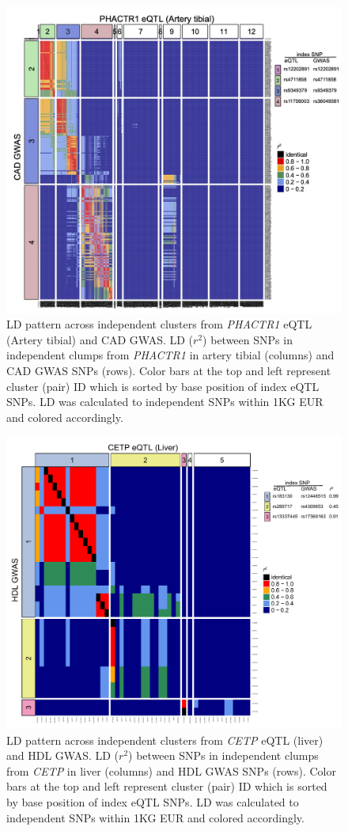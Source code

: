 \documentclass[11pt]{article}
\begin{document}
\begin{figure}[!ht]
  \centering
  \includegraphics[width=.7\textwidth]{figs/heatmap_phactr1.jpg}
  \caption{LD pattern across independent clusters from \emph{PHACTR1}
    eQTL (Artery tibial) and CAD GWAS. LD ($r^2$) between SNPs in
    independent clumps from \emph{PHACTR1} in artery tibial (columns)
    and CAD GWAS SNPs (rows). Color bars at the top and left represent
    cluster (pair) ID which is sorted by base position of index eQTL
    SNPs. LD was calculated to independent SNPs within 1KG EUR and
    colored accordingly.} 
\end{figure}

\begin{figure}[!ht]
  \centering
  \includegraphics[width=.7\textwidth]{figs/heatmap_cetp}
  \caption{LD pattern across independent clusters from \emph{CETP}
    eQTL (liver) and HDL GWAS. LD ($r^2$) between SNPs in independent
    clumps from \emph{CETP} in liver (columns) and HDL GWAS SNPs
    (rows). Color bars at the top and left represent cluster (pair) ID
    which is sorted by base position of index eQTL SNPs. LD was
    calculated to independent SNPs within 1KG EUR and colored
    accordingly.} 
\end{figure}
\end{document}
